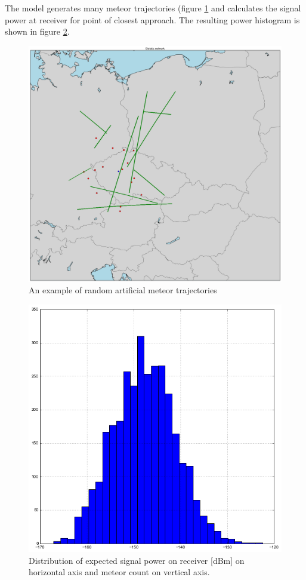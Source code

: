 \documentclass[twoside]{ctuthesis}
\theoremstyle{plain}
\theoremstyle{definition}
\theoremstyle{note}
\begin{document}
The model generates many meteor trajectories (figure \ref{VOR_meteors} and calculates the signal power at receiver for point of closest approach. The resulting power histogram is shown in figure \ref{VOR_meteors_intensity}.

\begin{figure}
\includegraphics[width=\textwidth]{./img/Modeled_meteor_trajectories.png}
\caption{An example of random artificial meteor trajectories}
\label{VOR_meteors}
\end{figure}

\begin{figure}
\includegraphics[width=\textwidth]{./img/Meteor_signal_intensity.png}
\caption{Distribution of expected signal power on receiver [dBm] on horizontal axis and meteor count on vertical axis.}
\label{VOR_meteors_intensity}
\end{figure}
\end{document}
